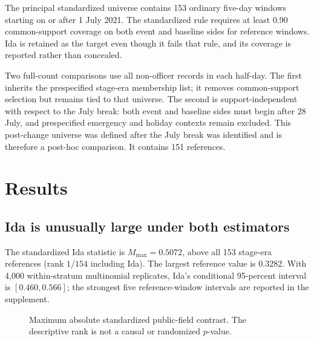 \documentclass[11pt]{article}
\begin{document}
The principal standardized universe contains 153 ordinary five-day windows starting on or after 1 July 2021. The standardized rule requires at least 0.90 common-support coverage on both event and baseline sides for reference windows. Ida is retained as the target even though it fails that rule, and its coverage is reported rather than concealed.

Two full-count comparisons use all non-officer records in each half-day. The first inherits the prespecified stage-era membership list; it removes common-support selection but remains tied to that universe. The second is support-independent with respect to the July break: both event and baseline sides must begin after 28 July, and prespecified emergency and holiday contexts remain excluded. This post-change universe was defined after the July break was identified and is therefore a post-hoc comparison. It contains 151 references.

\section{Results}

\subsection{Ida is unusually large under both estimators}

The standardized Ida statistic is $M_{\max}=0.5072$, above all 153 stage-era references (rank $1/154$ including Ida). The largest reference value is 0.3282. With 4,000 within-stratum multinomial replicates, Ida's conditional 95-percent interval is $[0.460,0.566]$; the strongest five reference-window intervals are reported in the supplement.

\begin{figure}[t]
\centering
{}
\caption{Maximum absolute standardized public-field contrast. The descriptive rank is not a causal or randomized $p$-value.}
\label{fig:rank}
\end{figure}
\end{document}
